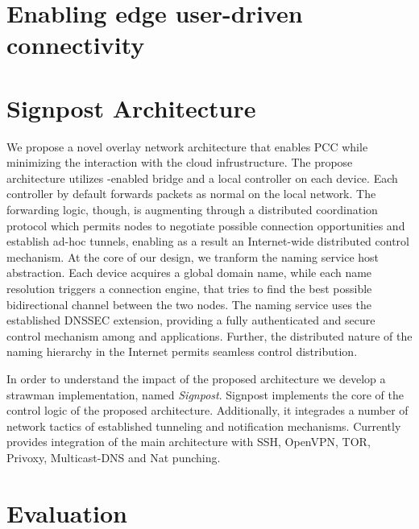 
\section{Enabling edge user-driven connectivity}\label{sec:signpost-design}



\section{Signpost Architecture}\label{sec:signpost-architecture}



We propose a novel overlay network architecture that enables PCC while
minimizing the interaction with the cloud infrustructure. 
The propose architecture utilizes \of-enabled bridge and a
local controller on each device. Each controller by default forwards packets as
normal on the local network. The forwarding logic, though,  is augmenting
through a distributed coordination protocol which permits nodes to negotiate
possible connection opportunities and establish ad-hoc tunnels, enabling as a
result an Internet-wide distributed control mechanism. At the core of
our design, we tranform the naming service host abstraction. Each device
acquires a global domain name, while each name resolution triggers a connection
engine, that tries to find the best possible bidirectional channel between the
two nodes. The naming service uses the established
DNSSEC extension, providing a fully authenticated and secure control
mechanism among \signpost and applications. Further, the distributed nature
of the naming hierarchy in the Internet permits seamless control distribution.

In order to understand the impact of the proposed architecture we develop a
strawman implementation, named {\it Signpost}. Signpost implements the core of
the control logic of the proposed architecture. Additionally, it integrades a
number of network tactics of established tunneling and notification mechanisms.
Currently \signpost provides integration of the main architecture with SSH, OpenVPN,
TOR, Privoxy, Multicast-DNS and Nat punching. 


\section{Evaluation}\label{sec:signpost-evaluation}


